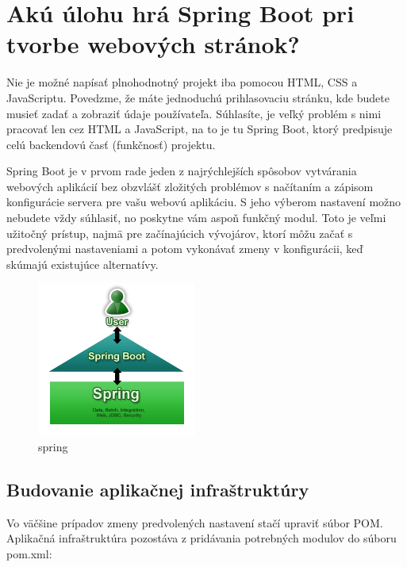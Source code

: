 \documentclass[12pt, letterpaper]{article}
\begin{document}
\section{Akú úlohu hrá Spring Boot pri tvorbe webových stránok?}
Nie je možné napísať plnohodnotný projekt iba pomocou HTML, CSS a JavaScriptu. Povedzme, že máte jednoduchú prihlasovaciu stránku, kde budete musieť zadať a zobraziť údaje používateľa. Súhlasíte, je veľký problém s nimi pracovať len cez HTML a JavaScript, na to je tu Spring Boot, ktorý predpisuje celú backendovú časť (funkčnosť) projektu.

	Spring Boot je v prvom rade jeden z najrýchlejších spôsobov vytvárania webových aplikácií bez obzvlášť zložitých problémov s načítaním a zápisom konfigurácie servera pre vašu webovú aplikáciu.
	S jeho výberom nastavení možno nebudete vždy súhlasiť, no poskytne vám aspoň funkčný modul. Toto je veľmi užitočný prístup, najmä pre začínajúcich vývojárov, ktorí môžu začať s predvolenými nastaveniami a potom vykonávať zmeny v konfigurácii, keď skúmajú existujúce alternatívy.

\begin{figure}[H]
	\centering
	\includegraphics[height=2in]{Spring_info.png}
	\caption[Optional caption]{spring} %
\end{figure}

	\subsection{Budovanie aplikačnej infraštruktúry}
		Vo väčšine prípadov zmeny predvolených nastavení stačí upraviť súbor POM. Aplikačná infraštruktúra pozostáva z pridávania potrebných modulov do súboru pom.xml:
	
\end{document}
